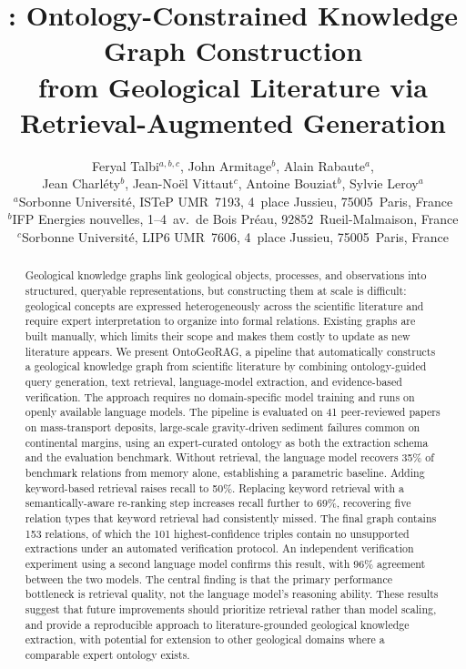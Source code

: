 \documentclass[10pt]{article}
\title{\vspace{-1.2em}
\textbf{\method: Ontology-Constrained Knowledge Graph Construction\\
from Geological Literature via Retrieval-Augmented Generation}
\vspace{-0.8em}}
\author{
Feryal Talbi$^{a,b,c}$,
John Armitage$^b$, Alain Rabaute$^a$,\\
Jean Charl\'ety$^b$, Jean-No\"el Vittaut$^c$,
Antoine Bouziat$^b$, Sylvie Leroy$^a$\\[5pt]
$^a$Sorbonne Universit\'e, ISTeP UMR~7193,
 4~place Jussieu, 75005~Paris, France\\
$^b$IFP Energies nouvelles,
 1--4~av.\ de Bois Pr\'eau, 92852~Rueil-Malmaison, France\\
$^c$Sorbonne Universit\'e, LIP6 UMR~7606,
 4~place Jussieu, 75005~Paris, France
}
\date{\vspace{-1em}}
\newcommand{\method}{OntoGeoRAG}
\begin{document}
\maketitle

\begin{abstract}



Geological knowledge graphs link geological objects, processes, and observations into structured, queryable representations, but constructing them at scale is difficult: geological concepts are expressed heterogeneously across the scientific literature and require expert interpretation to organize into formal relations. Existing graphs are built manually, which limits their scope and makes them costly to update as new literature appears.
We present \method{}, a pipeline that automatically constructs a geological knowledge graph from scientific literature by combining ontology-guided query generation, text retrieval, language-model extraction, and evidence-based verification. The approach requires no domain-specific model training and runs on openly available language models.
The pipeline is evaluated on 41 peer-reviewed papers on mass-transport deposits, large-scale gravity-driven sediment failures common on continental margins, using an expert-curated ontology as both the extraction schema and the evaluation benchmark. Without retrieval, the language model recovers 35\% of benchmark relations from memory alone, establishing a parametric baseline. Adding keyword-based retrieval raises recall to 50\%. Replacing keyword retrieval with a semantically-aware re-ranking step increases recall further to 69\%, recovering five relation types that keyword retrieval had consistently missed. The final graph contains 153 relations, of which the 101 highest-confidence triples contain no unsupported extractions under an automated verification protocol. An independent verification experiment using a second language model confirms this result, with 96\% agreement between the two models.
The central finding is that the primary performance bottleneck is retrieval quality, not the language model's reasoning ability. These results suggest that future improvements should prioritize retrieval rather than model scaling, and provide a reproducible approach to literature-grounded
geological knowledge extraction, with potential for
extension to other geological domains where a comparable
expert ontology exists.
\end{abstract}
\end{document}
